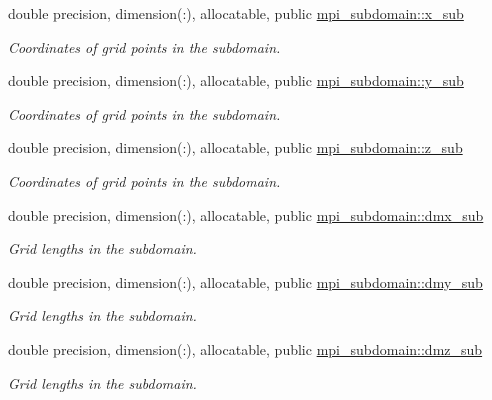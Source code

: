\textbf{ }\par
\begin{DoxyCompactItemize}
\item 
double precision, dimension(\+:), allocatable, public \mbox{\hyperlink{namespacempi__subdomain_a978554e1520c79471ef3793ed1872b37}{mpi\+\_\+subdomain\+::x\+\_\+sub}}
\begin{DoxyCompactList}\small\item\em Coordinates of grid points in the subdomain. \end{DoxyCompactList}\item 
double precision, dimension(\+:), allocatable, public \mbox{\hyperlink{namespacempi__subdomain_a58b09abee5f1002de7b20b1b86f5c821}{mpi\+\_\+subdomain\+::y\+\_\+sub}}
\begin{DoxyCompactList}\small\item\em Coordinates of grid points in the subdomain. \end{DoxyCompactList}\item 
double precision, dimension(\+:), allocatable, public \mbox{\hyperlink{namespacempi__subdomain_aab6d78e49471a9a3db5ad9df4c3d4041}{mpi\+\_\+subdomain\+::z\+\_\+sub}}
\begin{DoxyCompactList}\small\item\em Coordinates of grid points in the subdomain. \end{DoxyCompactList}\end{DoxyCompactItemize}

\textbf{ }\par
\begin{DoxyCompactItemize}
\item 
double precision, dimension(\+:), allocatable, public \mbox{\hyperlink{namespacempi__subdomain_a56af1740899dc9df6868e5e71a0884a5}{mpi\+\_\+subdomain\+::dmx\+\_\+sub}}
\begin{DoxyCompactList}\small\item\em Grid lengths in the subdomain. \end{DoxyCompactList}\item 
double precision, dimension(\+:), allocatable, public \mbox{\hyperlink{namespacempi__subdomain_ae44efbff9669bfad03a79ab41b5e8ace}{mpi\+\_\+subdomain\+::dmy\+\_\+sub}}
\begin{DoxyCompactList}\small\item\em Grid lengths in the subdomain. \end{DoxyCompactList}\item 
double precision, dimension(\+:), allocatable, public \mbox{\hyperlink{namespacempi__subdomain_afb6341d7362587d6fd0a06fe78ba4e3f}{mpi\+\_\+subdomain\+::dmz\+\_\+sub}}
\begin{DoxyCompactList}\small\item\em Grid lengths in the subdomain. \end{DoxyCompactList}\end{DoxyCompactItemize}

